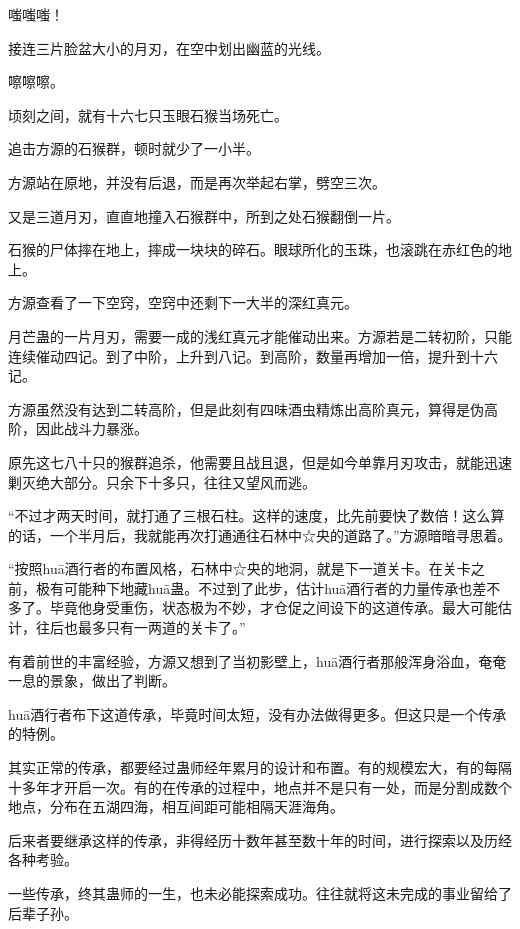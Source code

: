 
\begin{this_body}

嗤嗤嗤！

接连三片脸盆大小的月刃，在空中划出幽蓝的光线。

嚓嚓嚓。

顷刻之间，就有十六七只玉眼石猴当场死亡。

追击方源的石猴群，顿时就少了一小半。

方源站在原地，并没有后退，而是再次举起右掌，劈空三次。

又是三道月刃，直直地撞入石猴群中，所到之处石猴翻倒一片。

石猴的尸体摔在地上，摔成一块块的碎石。眼球所化的玉珠，也滚跳在赤红色的地上。

方源查看了一下空窍，空窍中还剩下一大半的深红真元。

月芒蛊的一片月刃，需要一成的浅红真元才能催动出来。方源若是二转初阶，只能连续催动四记。到了中阶，上升到八记。到高阶，数量再增加一倍，提升到十六记。

方源虽然没有达到二转高阶，但是此刻有四味酒虫精炼出高阶真元，算得是伪高阶，因此战斗力暴涨。

原先这七八十只的猴群追杀，他需要且战且退，但是如今单靠月刃攻击，就能迅速剿灭绝大部分。只余下十多只，往往又望风而逃。

“不过才两天时间，就打通了三根石柱。这样的速度，比先前要快了数倍！这么算的话，一个半月后，我就能再次打通通往石林中☆央的道路了。”方源暗暗寻思着。

“按照huā酒行者的布置风格，石林中☆央的地洞，就是下一道关卡。在关卡之前，极有可能种下地藏huā蛊。不过到了此步，估计huā酒行者的力量传承也差不多了。毕竟他身受重伤，状态极为不妙，才仓促之间设下的这道传承。最大可能估计，往后也最多只有一两道的关卡了。”

有着前世的丰富经验，方源又想到了当初影壁上，huā酒行者那般浑身浴血，奄奄一息的景象，做出了判断。

huā酒行者布下这道传承，毕竟时间太短，没有办法做得更多。但这只是一个传承的特例。

其实正常的传承，都要经过蛊师经年累月的设计和布置。有的规模宏大，有的每隔十多年才开启一次。有的在传承的过程中，地点并不是只有一处，而是分割成数个地点，分布在五湖四海，相互间距可能相隔天涯海角。

后来者要继承这样的传承，非得经历十数年甚至数十年的时间，进行探索以及历经各种考验。

一些传承，终其蛊师的一生，也未必能探索成功。往往就将这未完成的事业留给了后辈子孙。


\end{this_body}
